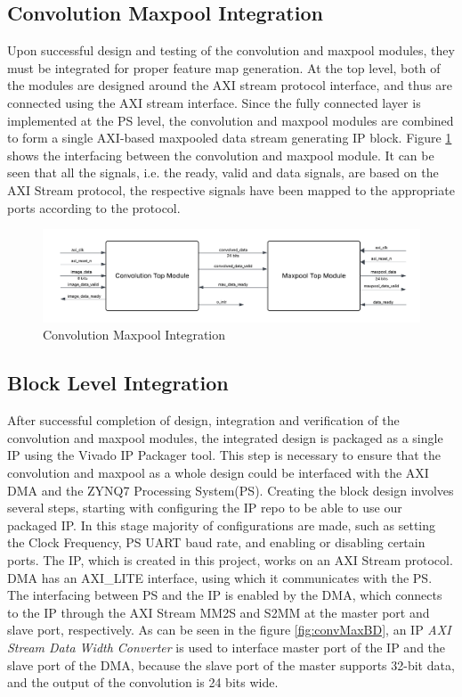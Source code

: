     \subsection{Convolution Maxpool Integration}
    \noindent
    Upon successful design and testing of the convolution and maxpool modules, they must be integrated for proper feature map generation. At the top level, both of the modules are designed around the AXI stream protocol interface, and thus are connected using the AXI stream interface. Since the fully connected layer is implemented at the PS level, the convolution and maxpool modules are combined to form a single AXI-based maxpooled data stream generating IP block. Figure \ref{fig:conv_max_integration} shows the interfacing between the convolution and maxpool module. It can be seen that all the signals, i.e. the ready, valid and data signals, are based on the AXI Stream protocol, the respective signals have been mapped to the appropriate ports according to the protocol.

    \begin{figure}[h]
        \centering
        \includegraphics[width=1\linewidth]{images/conv_max_integration.png}
        \caption{Convolution Maxpool Integration}
        \label{fig:conv_max_integration}
    \end{figure}

    \subsection{Block Level Integration}
    \noindent
    After successful completion of design, integration and verification of the convolution and maxpool modules, the integrated design is packaged as a single IP using the Vivado IP Packager tool. This step is necessary to ensure that the convolution and maxpool as a whole design could be interfaced with the AXI DMA and the ZYNQ7 Processing System(PS). Creating the block design involves several steps, starting with configuring the IP repo to be able to use our packaged IP. In this stage majority of configurations are made, such as setting the Clock Frequency, PS UART baud rate, and enabling or disabling certain ports. The IP, which is created in this project, works on an AXI Stream protocol. DMA has an AXI\_LITE interface, using which it communicates with the PS. The interfacing between PS and the IP is enabled by the DMA, which connects to the IP through the AXI Stream MM2S and S2MM at the master port and slave port, respectively. As can be seen in the figure \ref{fig:convMaxBD}, an IP \textit{AXI Stream Data Width Converter} is used to interface master port of the IP and the slave port of the DMA, because the slave port of the master supports 32-bit data, and the output of the convolution is 24 bits wide.

